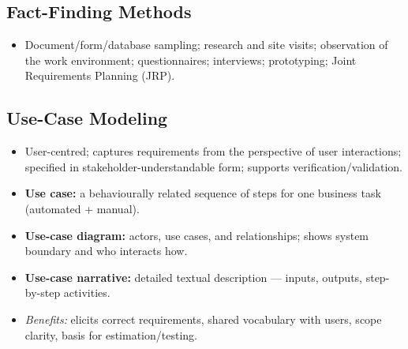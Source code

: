 \documentclass[hidelinks]{article}
\begin{document}
\subsection{Fact-Finding Methods}
\begin{itemize}
  \item Document/form/database sampling; research and site visits; observation of the work
        environment; questionnaires; interviews; prototyping; Joint Requirements Planning (JRP).
\end{itemize}

\subsection{Use-Case Modeling}
\begin{itemize}
  \item User-centred; captures requirements from the perspective of user interactions; specified
        in stakeholder-understandable form; supports verification/validation.
  \item \textbf{Use case:} a behaviourally related sequence of steps for one business task
        (automated + manual).
  \item \textbf{Use-case diagram:} actors, use cases, and relationships; shows system boundary and
        who interacts how.
  \item \textbf{Use-case narrative:} detailed textual description --- inputs, outputs, step-by-step
        activities.
  \item \emph{Benefits:} elicits correct requirements, shared vocabulary with users, scope clarity,
        basis for estimation/testing.
\end{itemize}
\end{document}
